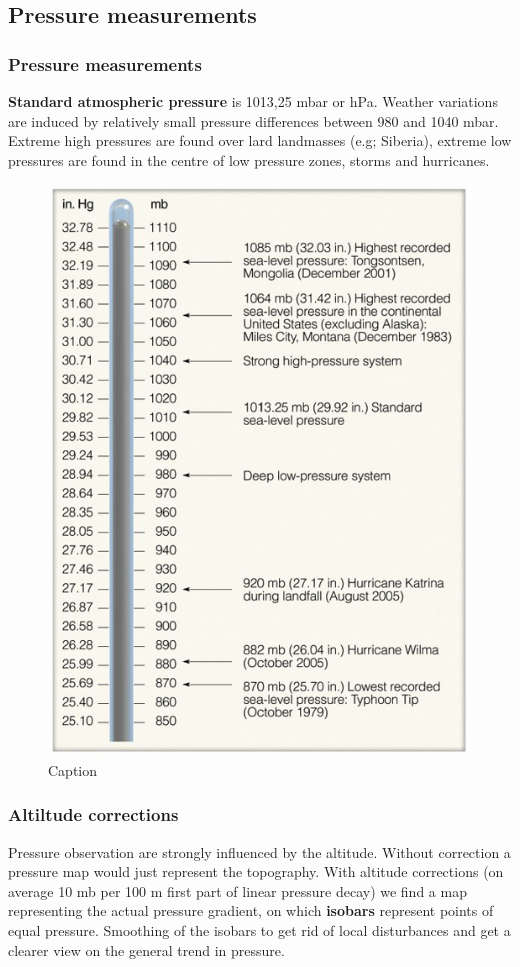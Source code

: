 \documentclass[oneside]{book}
\begin{document}
\subsection{Pressure measurements}\label{pressure-measurements}

\subsubsection{Pressure measurements}\label{pressure-measurements-1}

\textbf{Standard atmospheric pressure} is 1013,25 mbar or hPa. Weather
variations are induced by relatively small pressure differences between
980 and 1040 mbar. Extreme high pressures are found over lard landmasses
(e.g; Siberia), extreme low pressures are found in the centre of low
pressure zones, storms and hurricanes.

\begin{figure}

{\centering \includegraphics[width=0.4\linewidth]{figures/Figure43} 

}

\caption{Caption}\label{fig:Pmes}
\end{figure}

\subsubsection{Altiltude corrections}\label{altiltude-corrections}

Pressure observation are strongly influenced by the altitude. Without
correction a pressure map would just represent the topography. With
altitude corrections (on average 10 mb per 100 m first part of linear
pressure decay) we find a map representing the actual pressure gradient,
on which \textbf{isobars} represent points of equal pressure. Smoothing
of the isobars to get rid of local disturbances and get a clearer view
on the general trend in pressure.
\end{document}
